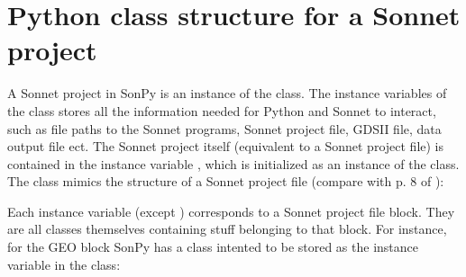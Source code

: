 \documentclass[letterpaper,10pt,english,openany]{sphinxmanual}
\begin{document}
\section{Python class structure for a Sonnet project}
\label{\detokenize{source/dev_guide:python-class-structure-for-a-sonnet-project}}
A Sonnet project in SonPy is an instance of the  class. The instance variables of the  class stores all the information needed for Python and Sonnet to interact, such as file paths to the Sonnet programs, Sonnet project file, GDSII file, data output file ect. The Sonnet project itself (equivalent to a Sonnet project file) is contained in the instance variable , which is initialized as an instance of the  class. The  class mimics the structure of a Sonnet project file (compare with p. 8 of \label{\detokenize{source/dev_guide:id2}}{\hyperref[\detokenize{source/users_guide:son15}]{\sphinxcrossref{{[}Son15{]}}}}):

%
\begin{sphinxVerbatim}[commandchars=\\\{\}]
 
     
          
          
          
          
          
          
          
          
          
          
          
\end{sphinxVerbatim}

Each instance variable (except ) corresponds to a Sonnet project file block. They are all classes themselves containing stuff belonging to that block. For instance, for the GEO block SonPy has a class  intented to be stored as the  instance variable in the  class:
\end{document}
